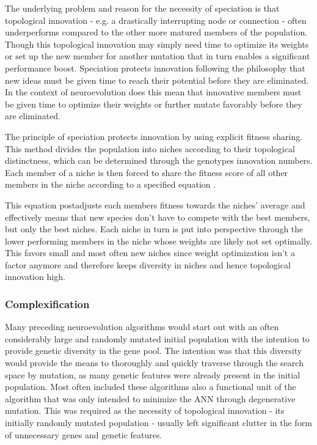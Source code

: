 \documentclass[journal, a4paper]{IEEEtran}
\begin{document}
The underlying problem and reason for the necessity of speciation is that topological innovation - e.g. a drastically interrupting node or connection - often underperforms compared to the other more matured members of the population. Though this topological innovation may simply need time to optimize its weights or set up the new member for another mutation that in turn enables a significant performance boost. Speciation protects innovation following the philosophy that new ideas must be given time to reach their potential before they are eliminated. In the context of neuroevolution does this mean that innovative members must be given time to optimize their weights or further mutate favorably before they are eliminated.

The principle of speciation protects innovation by using explicit fitness sharing. This method divides the population into niches according to their topological distinctness, which can be determined through the genotypes innovation numbers. Each member of a niche is then forced to share the fitness score of all other members in the niche according to a specified equation \cite[chap 3.3]{sta04}.

This equation postadjusts each members fitness towards the niches' average and effectively means that new species don't have to compete with the best members, but only the best niches. Each niche in turn is put into perspective through the lower performing members in the niche whose weights are likely not set optimally. This favors small and most often new niches since weight optimization isn't a factor anymore and therefore keeps diversity in niches and hence topological innovation high. 



\subsubsection{\textbf{Complexification}}
Many preceding neuroevolution algorithms would start out with an often considerably large and randomly mutated initial population with the intention to provide genetic diversity in the gene pool. The intention was that this diversity would provide the means to thoroughly and quickly traverse through the search space by mutation, as many genetic features were already present in the initial population. Most often included these algorithms also a functional unit of the algorithm that was only intended to minimize the ANN through degenerative mutation. This was required as the necessity of topological innovation - its initially randomly mutated population - usually left significant clutter in the form of unnecessary genes and genetic features.
\end{document}
